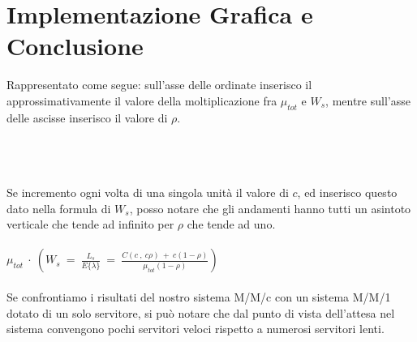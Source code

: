 \documentclass[12pt,a4paper]{article}
\begin{document}
\section{Implementazione Grafica e Conclusione}
Rappresentato come segue:
sull'asse delle ordinate inserisco il approssimativamente il valore della moltiplicazione fra $\mu_{tot}$ e $W_{s}$, mentre sull'asse delle ascisse inserisco il valore di $\rho$. \\ \\
 \\ \\
Se incremento ogni volta di una singola unità il valore di $c$, ed inserisco questo dato nella formula di $W_{s}$, posso notare che gli andamenti hanno tutti un asintoto verticale che tende ad infinito per $\rho$ che tende ad uno.  \\ \\
$\mu_{tot} \ \cdot \ ( W_{s} \ = \ \frac{L_{s}}{E\{\lambda\}} \ = \ \frac{C(c \ , \ c\rho) \ + \ c(1-\rho)}{\mu_{tot}(1-\rho)} )$ \\ \\
Se confrontiamo i risultati del nostro sistema M/M/c con un sistema M/M/1 dotato di un solo servitore, si può notare che dal punto di vista dell'attesa nel sistema convengono pochi servitori veloci rispetto a numerosi servitori lenti.\\
\end{document}
